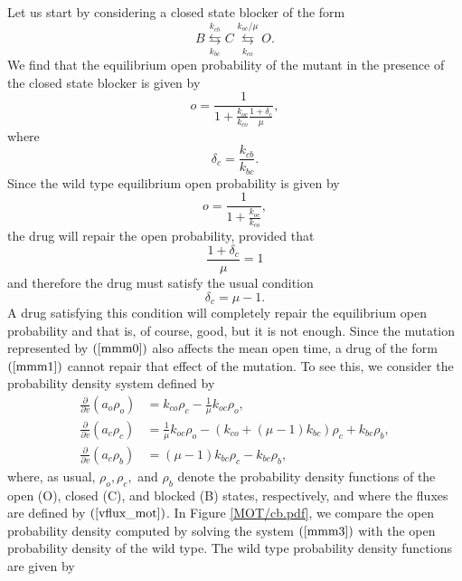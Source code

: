 Let us start by considering a closed state blocker of the form%
\begin{equation}
B\underset{k_{bc}}{\overset{k_{cb}}{\leftrightarrows}}C\underset{k_{co}}{\overset{k_{oc}/\mu}{\leftrightarrows}}O. \label{mmm1}%
\end{equation}
We find that the equilibrium open probability of the mutant in the presence of the
closed state blocker is given by%
\[
o=\frac{1}{1+\frac{k_{oc}}{k_{co}}\frac{1+\delta_{c}}{\mu}},%
\]
where%
\[
\delta_{c}=\frac{k_{cb}}{k_{bc}}.
\]
Since the wild type equilibrium open probability is given by%
\[
o=\frac{1}{1+\frac{k_{oc}}{k_{co}}},%
\]
the drug will repair the open probability, provided that%
\[
\frac{1+\delta_{c}}{\mu}=1
\]
and therefore the drug must satisfy the usual condition%
\[
\delta_{c}=\mu-1.
\]
A drug satisfying this condition will completely repair the equilibrium open
probability and that is, of course, good, but it is not enough. Since the
mutation represented by $\left(  \ref{mmm0}\right)  $ also affects the mean
open time, a drug of the form $\left(  \ref{mmm1}\right)  $ cannot repair that
effect of the mutation. To see this, we consider the probability
density system defined by%
\begin{align}
\frac{\partial}{\partial v}\left(  a_{o}\rho_{o}\right)   &  =k_{co}\rho
_{c}-\frac{1}{\mu}k_{oc}\rho_{o},\nonumber\\
\frac{\partial}{\partial v}\left(  a_{c}\rho_{c}\right)   &  =\frac{1}{\mu}k_{oc}\rho
_{o}-\left(  k_{co}+\left(  \mu-1\right)  k_{bc}\right)  \rho_{c}+k_{bc}%
\rho_{b},\label{mmm3}\\
\frac{\partial}{\partial v}\left(  a_{c}\rho_{b}\right)   &  =\left(
\mu-1\right)  k_{bc}\rho_{c}-k_{bc}\rho_{b},\nonumber
\end{align}
where, as usual, $\rho_{o},\rho_{c},$ and $\rho_{b}$ denote the probability
density functions of the open (O), closed (C), and blocked (B) states,
respectively, and where the fluxes are defined by $\left(  \ref{vflux_mot}%
\right)  $. In Figure \ref{MOT/cb.pdf}, we compare the open probability density computed by
solving the system $\left(  \ref{mmm3}\right)  $ with the open probability
density of the wild type. The wild type probability density functions are
given by%

